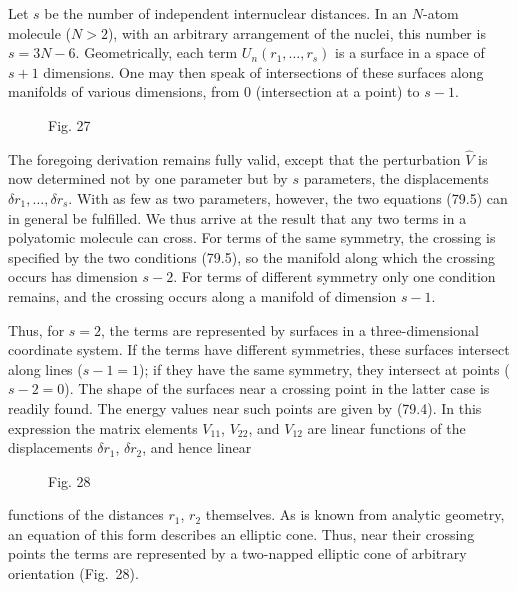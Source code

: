 Let $s$ be the number of independent internuclear distances. In an $N$-atom molecule ($N>2$), with an arbitrary arrangement of the nuclei, this number is $s=3N-6$. Geometrically, each term $U_n(r_1,\ldots,r_s)$ is a surface in a space of $s+1$ dimensions. One may then speak of intersections of these surfaces along manifolds of various dimensions, from 0 (intersection at a point) to $s-1$.

\begin{figure}[ht]
\centering
{}
\caption*{Fig. 27}
\end{figure}

The foregoing derivation remains fully valid, except that the perturbation $\widehat V$ is now determined not by one parameter but by $s$ parameters, the displacements $\delta r_1,\ldots,\delta r_s$. With as few as two parameters, however, the two equations (79.5) can in general be fulfilled. We thus arrive at the result that any two terms in a polyatomic molecule can cross. For terms of the same symmetry, the crossing is specified by the two conditions (79.5), so the manifold along which the crossing occurs has dimension $s-2$. For terms of different symmetry only one condition remains, and the crossing occurs along a manifold of dimension $s-1$.

Thus, for $s=2$, the terms are represented by surfaces in a three-dimensional coordinate system. If the terms have different symmetries, these surfaces intersect along lines ($s-1=1$); if they have the same symmetry, they intersect at points ($s-2=0$). The shape of the surfaces near a crossing point in the latter case is readily found. The energy values near such points are given by (79.4). In this expression the matrix elements $V_{11}$, $V_{22}$, and $V_{12}$ are linear functions of the displacements $\delta r_1$, $\delta r_2$, and hence linear

\begin{figure}[ht]
\centering
{}
\caption*{Fig. 28}
\end{figure}

functions of the distances $r_1$, $r_2$ themselves. As is known from analytic geometry, an equation of this form describes an elliptic cone. Thus, near their crossing points the terms are represented by a two-napped elliptic cone of arbitrary orientation (Fig.~28).
